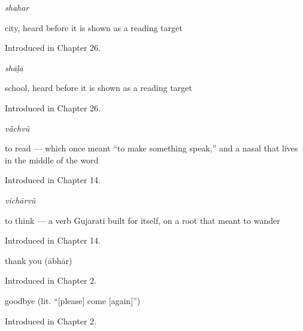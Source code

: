 \noindent\begin{minipage}[t]{\linewidth}
\raggedright
\textbf{}\enspace\emph{shahar}\par
\small city, heard before it is shown as a reading target\par
\footnotesize Introduced in Chapter 26.
\end{minipage}\par\medskip

\noindent\begin{minipage}[t]{\linewidth}
\raggedright
\textbf{}\enspace\emph{shāḷā}\par
\small school, heard before it is shown as a reading target\par
\footnotesize Introduced in Chapter 26.
\end{minipage}\par\medskip

\noindent\begin{minipage}[t]{\linewidth}
\raggedright
\textbf{}\enspace\emph{vā̃chvũ}\par
\small to read — which once meant \textquotedblleft{}to make something speak,\textquotedblright{} and a nasal that lives in the middle of the word\par
\footnotesize Introduced in Chapter 14.
\end{minipage}\par\medskip

\noindent\begin{minipage}[t]{\linewidth}
\raggedright
\textbf{}\enspace\emph{vichārvũ}\par
\small to think — a verb Gujarati built for itself, on a root that meant to wander\par
\footnotesize Introduced in Chapter 14.
\end{minipage}\par\medskip

\noindent\begin{minipage}[t]{\linewidth}
\raggedright
\textbf{}\par
\small thank you (ābhār)\par
\footnotesize Introduced in Chapter 2.
\end{minipage}\par\medskip

\noindent\begin{minipage}[t]{\linewidth}
\raggedright
\textbf{}\par
\small goodbye (lit. \textquotedblleft{}{[}please{]} come {[}again{]}\textquotedblright{})\par
\footnotesize Introduced in Chapter 2.
\end{minipage}\par\medskip

